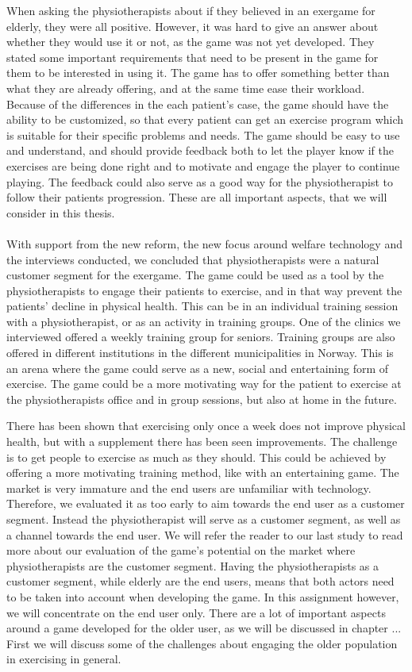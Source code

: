When asking the physiotherapists about if they believed in an exergame for elderly, they were all positive. However, it was hard to give an answer about whether they would use it or not, as the game was not yet developed. They stated some important requirements that need to be present in the game for them to be interested in using it. The game has to offer something better than what they are already offering, and at the same time ease their workload. Because of the differences in the each patient's case, the game should have the ability to be customized, so that every patient can get an exercise program which is suitable for their specific problems and needs. The game should be easy to use and understand, and should provide feedback both to let the player know if the exercises are being done right and to motivate and engage the player to continue playing. The feedback could also serve as a good way for the physiotherapist to follow their patients progression. These are all important aspects, that we will consider in this thesis. \\ \\
With support from the new reform, the new focus around welfare technology and the interviews conducted, we concluded that physiotherapists were a natural customer segment for the exergame. The game could be used as a tool by the physiotherapists to engage their patients to exercise, and in that way prevent the patients’ decline in physical health. This can be in an individual training session with a physiotherapist, or as an activity in training groups. One of the clinics we interviewed offered a weekly training group for seniors. Training groups are also offered in different institutions in the different municipalities in Norway. This is an arena where the game could serve as a new, social and entertaining form of exercise. The game could be a more motivating way for the patient to exercise at the physiotherapists office and in group sessions, but also at home in the future. 

There has been shown that exercising only once a week does not improve physical health, but with a supplement there has been seen improvements. The challenge is to get people to exercise as much as they should. This could be achieved by offering a more motivating training method, like with an entertaining game. The market is very immature and the end users are unfamiliar with technology. Therefore, we evaluated it as too early to aim towards the end user as a customer segment. Instead the physiotherapist will serve as a customer segment, as well as a channel towards the end user. We will refer the reader to our last study \cite{project} to read more about our evaluation of the game's potential on the market where physiotherapists are the customer segment. Having the physiotherapists as a customer segment, while elderly are the end users, means that both actors need to be taken into account when developing the game. In this assignment however, we will concentrate on the end user only. There are a lot of important aspects around a game developed for the older user, as we will be discussed in chapter ... First we will discuss some of the challenges about engaging the older population in exercising in general.  